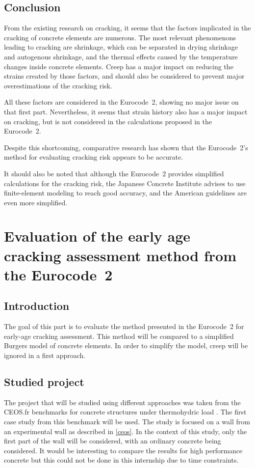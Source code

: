 \documentclass[a4paper,11pt]{memoir}
\begin{document}
\section{Conclusion}

From the existing research on cracking, it seems that the factors implicated in
the cracking of concrete elements are numerous. The most relevant phenomenons
leading to cracking are shrinkage, which can be separated in drying shrinkage
and autogenous shrinkage, and the thermal effects caused by the temperature
changes inside concrete elements. Creep has a major impact on reducing the
strains created by those factors, and should also be considered to prevent
major overestimations of the cracking risk.

All these factors are considered in the Eurocode~2, showing no major issue on
that first part. Nevertheless, it seems that strain history also has a major
impact on cracking, but is not considered in the calculations proposed in the
Eurocode~2.

Despite this shortcoming, comparative research has shown that the Eurocode~2's
method for evaluating cracking risk appears to be accurate.

It should also be noted that although the Eurocode~2 provides simplified
calculations for the cracking risk, the Japanese Concrete Institute advises to
use finite-element modeling to reach good accuracy, and the American guidelines
are even more simplified.

\chapter[Evaluation of Eurocode~2]{Evaluation of the early age cracking assessment method from the
Eurocode~2}
\section{Introduction}
The goal of this part is to evaluate the method presented in the Eurocode~2 for
early-age cracking assessment. This method will be compared to a simplified
Burgers model \cite{soa} of concrete elements. In order to simplify the
model, creep will be ignored in a first approach.

\section{Studied project}
The project that will be studied using different approaches was taken from the
CEOS.fr benchmarks for concrete structures under thermohydric load
\cite{ceos}. The first case study from this benchmark will be used. The study
is focused on a wall from an experimental wall as described in \autoref{ceos}.
In the context of this study, only the first part of the wall will be
considered, with an ordinary concrete being considered. It would be interesting
to compare the results for high performance concrete but this could not be done
in this internship due to time constraints.
\end{document}
